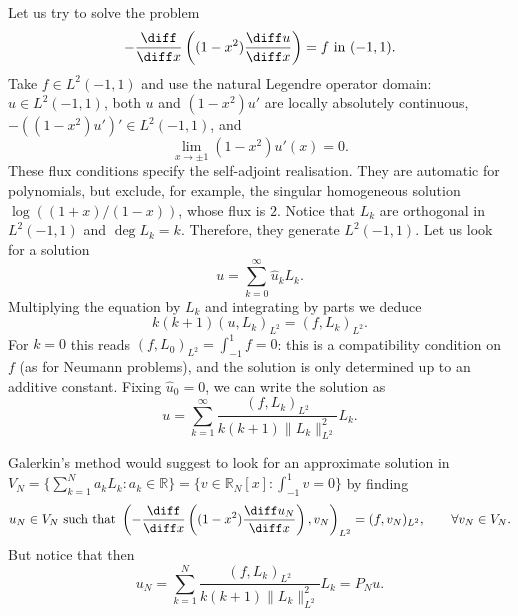 \begin{example}
    Let us try to solve the problem
    \begin{equation*}
        -\frac{\diff}{\diff x}\left((1-x^2) \frac{\diff u}{\diff x}\right) = f \text{ in } (-1,1).
    \end{equation*}
    Take $f\in L^2(-1,1)$ and use the natural Legendre operator domain: $u\in L^2(-1,1)$, both $u$ and $(1-x^2)u'$ are locally absolutely continuous, $-((1-x^2)u')'\in L^2(-1,1)$, and
    \begin{equation*}
        \lim_{x\to\pm1}(1-x^2)u'(x)=0.
    \end{equation*}
    These flux conditions specify the self-adjoint realisation. They are automatic for polynomials, but exclude, for example, the singular homogeneous solution $\log((1+x)/(1-x))$, whose flux is $2$.
    Notice that $L_k$ are orthogonal in $L^2(-1,1)$ and $\deg L_k = k$. Therefore, they generate $L^2(-1,1)$. Let us look for a solution
    \begin{equation*}
        u = \sum_{k=0}^\infty \hat u_k L_k.
    \end{equation*}
    Multiplying the equation by $L_k$ and integrating by parts we deduce
    \begin{equation*}
        k(k+1) (u, L_k)_{L^2} = (f, L_k)_{L^2}.
    \end{equation*}
    For $k = 0$ this reads $(f, L_0)_{L^2} = \int_{-1}^1 f = 0$: this is a compatibility condition on $f$ (as for Neumann problems), and the solution is only determined up to an additive constant. Fixing $\hat u_0 = 0$, we can write the solution as
    \begin{equation*}
        u = \sum_{k=1}^\infty \frac{(f, L_k)_{L^2}}{k(k+1) \|L_k\|_{L^2}^2} L_k.
    \end{equation*}

    Galerkin's method would suggest to look for an approximate solution in $V_N = \{ \sum_{k=1}^N a_k L_k : a_k \in \mathbb R\} = \{ v \in \mathbb R_N[x] : \int_{-1}^1 v = 0 \}$ by finding
    \begin{equation*}
        u_N \in V_N \text{ such that } \left( -\frac{\diff}{\diff x}\left((1-x^2) \frac{\diff u_N}{\diff x}\right), v_N \right)_{L^2} = (f, v_N)_{L^2}, \qquad \forall v_N \in V_N.
    \end{equation*}
    But notice that then
    \begin{equation*}
        u_N = \sum_{k=1}^N \frac{(f, L_k)_{L^2}}{k(k+1) \|L_k\|_{L^2}^2} L_k = P_N u.
    \end{equation*}
\end{example}